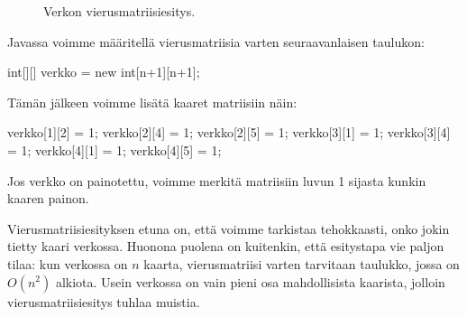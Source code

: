 \begin{figure}
\center
\begin{center}
\end{center}
\caption{Verkon vierusmatriisiesitys.}
\label{fig:vervim}
\end{figure}

Javassa voimme määritellä vierusmatriisia varten seuraavanlaisen taulukon:

\begin{code}
int[][] verkko = new int[n+1][n+1];
\end{code}

Tämän jälkeen voimme lisätä kaaret matriisiin näin:

\begin{code}
verkko[1][2] = 1;
verkko[2][4] = 1;
verkko[2][5] = 1;
verkko[3][1] = 1;
verkko[3][4] = 1;
verkko[4][1] = 1;
verkko[4][5] = 1;
\end{code}

Jos verkko on painotettu, voimme merkitä matriisiin luvun 1 sijasta
kunkin kaaren painon.

Vierusmatriisiesityksen etuna on, että voimme tarkistaa tehokkaasti,
onko jokin tietty kaari verkossa.
Huonona puolena on kuitenkin, että esitystapa vie paljon tilaa:
kun verkossa on $n$ kaarta, vierusmatriisi varten tarvitaan taulukko,
jossa on $O(n^2)$ alkiota.
Usein verkossa on vain pieni osa mahdollisista kaarista,
jolloin vierusmatriisiesitys tuhlaa muistia.

